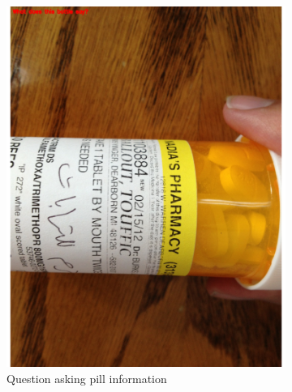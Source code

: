 \documentclass[sigconf]{acmart}
\begin{document}
\begin{figure}[hbp]
        \centering
        \begin{subfigure}[b]{0.3\columnwidth}
                \includegraphics[scale=0.2]{images/health_1.pdf}  
                \caption{Question asking pill information}
                \label{fig:pill}
        \end{subfigure}%
        ~ 
        \begin{subfigure}[b]{0.3\columnwidth}

\end{subfigure}
\end{figure}
\end{document}
